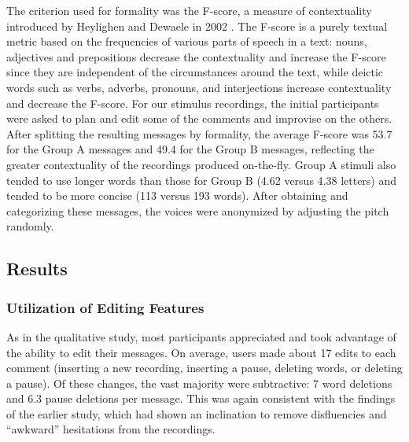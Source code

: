 The criterion used for formality was the F-score, a measure of contextuality introduced by Heylighen and Dewaele in 2002 \cite{heylighen}.
The F-score is a purely textual metric based on the frequencies of various parts of speech in a text: nouns, adjectives and prepositions decrease the contextuality and increase the F-score since they are independent of the circumstances around the text, while deictic words such as verbs, adverbs, pronouns, and interjections increase contextuality and decrease the F-score. 
For our stimulus recordings, the initial participants were asked to plan and edit some of the comments and improvise on the others.
After splitting the resulting messages by formality, the average F-score was 53.7 for the Group A messages and 49.4 for the Group B messages, reflecting the greater contextuality of the recordings produced on-the-fly.
Group A stimuli also tended to use longer words than those for Group B (4.62 versus 4.38 letters) and tended to be more concise (113 versus 193 words).
After obtaining and categorizing these messages, the voices were anonymized by adjusting the pitch randomly.


\subsection{Results}

\subsubsection{Utilization of Editing Features}
As in the qualitative study, most participants appreciated and took advantage of the ability to edit their messages.  
On average, users made about 17 edits to each comment (inserting a new recording, inserting a pause, deleting words, or deleting a pause). 
Of these changes, the vast majority were subtractive: 7 word deletions and 6.3 pause deletions per message.
This was again consistent with the findings of the earlier study, which had shown an inclination to remove disfluencies and ``awkward'' hesitations from the recordings.

